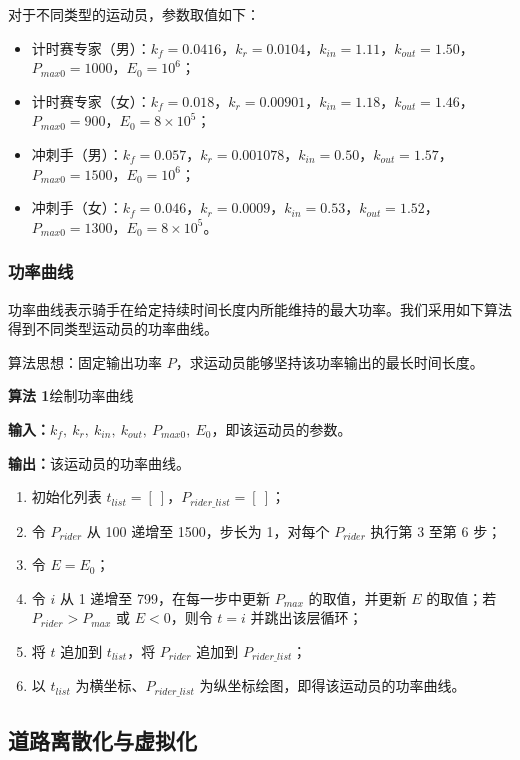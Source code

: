\documentclass[11pt,a4paper]{ctexart}
\begin{document}
对于不同类型的运动员，参数取值如下：

\begin{itemize}
\item 计时赛专家（男）：$k_f=0.0416$，$k_r=0.0104$，$k_{in}=1.11$，$k_{out}=1.50$，$P_{max0}=1000$，$E_0=10^{6}$；
\item 计时赛专家（女）：$k_f=0.018$，$k_r=0.00901$，$k_{in}=1.18$，$k_{out}=1.46$，$P_{max0}=900$，$E_0=8\times10^{5}$；
\item 冲刺手（男）：$k_f=0.057$，$k_r=0.001078$，$k_{in}=0.50$，$k_{out}=1.57$，$P_{max0}=1500$，$E_0=10^{6}$；
\item 冲刺手（女）：$k_f=0.046$，$k_r=0.0009$，$k_{in}=0.53$，$k_{out}=1.52$，$P_{max0}=1300$，$E_0=8\times10^{5}$。
\end{itemize}

\subsubsection{功率曲线}

功率曲线表示骑手在给定持续时间长度内所能维持的最大功率。我们采用如下算法得到不同类型运动员的功率曲线。

算法思想：固定输出功率 $P$，求运动员能够坚持该功率输出的最长时间长度。

\noindent\textbf{算法 1}\quad 绘制功率曲线

\noindent\textbf{输入：}$k_f,\ k_r,\ k_{in},\ k_{out},\ P_{max0},\ E_0$，即该运动员的参数。

\noindent\textbf{输出：}该运动员的功率曲线。

\begin{enumerate}
\item 初始化列表 $t_{list}=[\ ]$，$P_{rider\_list}=[\ ]$；
\item 令 $P_{rider}$ 从 100 递增至 1500，步长为 1，对每个 $P_{rider}$ 执行第 3 至第 6 步；
\item 令 $E=E_0$；
\item 令 $i$ 从 1 递增至 799，在每一步中更新 $P_{max}$ 的取值，并更新 $E$ 的取值；若 $P_{rider}>P_{max}$ 或 $E<0$，则令 $t=i$ 并跳出该层循环；
\item 将 $t$ 追加到 $t_{list}$，将 $P_{rider}$ 追加到 $P_{rider\_list}$；
\item 以 $t_{list}$ 为横坐标、$P_{rider\_list}$ 为纵坐标绘图，即得该运动员的功率曲线。
\end{enumerate}

\subsection{道路离散化与虚拟化}
\end{document}
